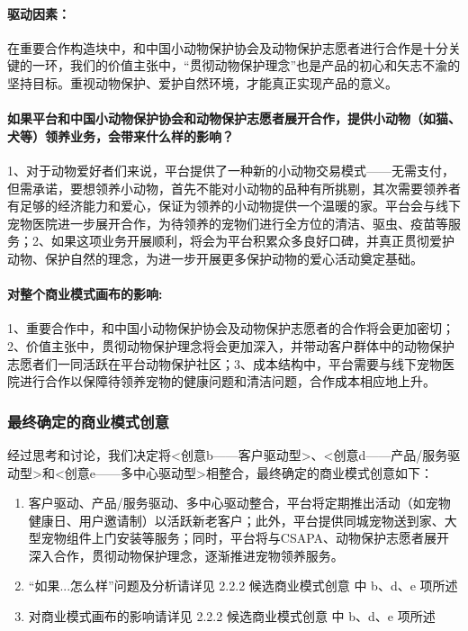 \documentclass[a4paper]{ctexart}
\begin{document}
\begin{enumerate}[label=\alph*.]
  \paragraph{驱动因素：}在重要合作构造块中，和中国小动物保护协会及动物保护志愿者进行合作是十分关键的一环，我们的价值主张中，“贯彻动物保护理念”也是产品的初心和矢志不渝的坚持目标。重视动物保护、爱护自然环境，才能真正实现产品的意义。
  \paragraph{如果平台和中国小动物保护协会和动物保护志愿者展开合作，提供小动物（如猫、犬等）领养业务，会带来什么样的影响？}1、对于动物爱好者们来说，平台提供了一种新的小动物交易模式——无需支付，但需承诺，要想领养小动物，首先不能对小动物的品种有所挑剔，其次需要领养者有足够的经济能力和爱心，保证为领养的小动物提供一个温暖的家。平台会与线下宠物医院进一步展开合作，为待领养的宠物们进行全方位的清洁、驱虫、疫苗等服务；2、如果这项业务开展顺利，将会为平台积累众多良好口碑，并真正贯彻爱护动物、保护自然的理念，为进一步开展更多保护动物的爱心活动奠定基础。
  \paragraph{对整个商业模式画布的影响:}1、重要合作中，和中国小动物保护协会及动物保护志愿者的合作将会更加密切；2、价值主张中，贯彻动物保护理念将会更加深入，并带动客户群体中的动物保护志愿者们一同活跃在平台动物保护社区；3、成本结构中，平台需要与线下宠物医院进行合作以保障待领养宠物的健康问题和清洁问题，合作成本相应地上升。
\end{enumerate}

\subsubsection{最终确定的商业模式创意}

经过思考和讨论，我们决定将<创意b——客户驱动型>、<创意d——产品/服务驱动型>和<创意e——多中心驱动型>相整合，最终确定的商业模式创意如下：
\begin{enumerate}[label=\alph*.]
  \item 客户驱动、产品/服务驱动、多中心驱动整合，平台将定期推出活动（如宠物健康日、用户邀请制）以活跃新老客户；此外，平台提供同城宠物送到家、大型宠物组件上门安装等服务；同时，平台将与CSAPA、动物保护志愿者展开深入合作，贯彻动物保护理念，逐渐推进宠物领养服务。
  \item “如果...怎么样”问题及分析请详见 2.2.2 候选商业模式创意 中 b、d、e 项所述
  \item 对商业模式画布的影响请详见 2.2.2 候选商业模式创意 中 b、d、e 项所述
\end{enumerate}
\end{document}
